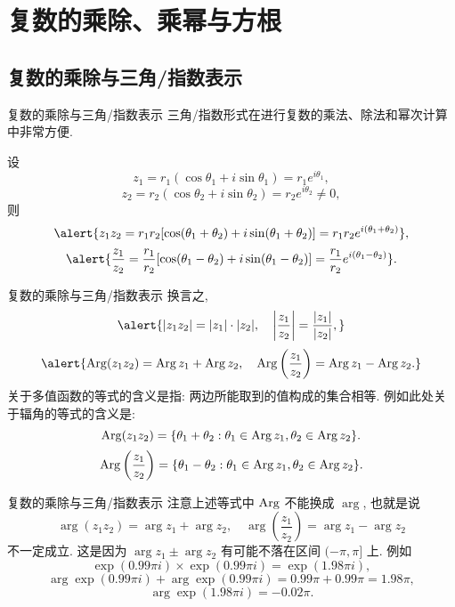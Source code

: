 \section{复数的乘除、乘幂与方根}

\subsection{复数的乘除与三角/指数表示}
\begin{frame}{复数的乘除与三角/指数表示}
	\onslide<+->
	三角/指数形式在进行复数的乘法、除法和幂次计算中非常方便.

	\onslide<+->
	\begin{theorem}
		设
		\[z_1=r_1(\cos\theta_1+i\sin\theta_1)=r_1e^{i\theta_1},\]
		\[z_2=r_2(\cos\theta_2+i\sin\theta_2)=r_2e^{i\theta_2}\neq 0,\]
		则
		\[\alert{z_1z_2=r_1r_2[\cos(\theta_1+\theta_2)+i\sin(\theta_1+\theta_2)]=r_1r_2e^{i(\theta_1+\theta_2)}},\]
		\[\alert{\frac{z_1}{z_2}=\frac{r_1}{r_2}[\cos(\theta_1-\theta_2)+i\sin(\theta_1-\theta_2)]=\frac{r_1}{r_2}e^{i(\theta_1-\theta_2)}}.\]
	\end{theorem}
\end{frame}


\begin{frame}{复数的乘除与三角/指数表示}
	\onslide<+->
	换言之,
	\[\alert{|z_1z_2|=|z_1|\cdot|z_2|,\quad\abs{\frac{z_1}{z_2}}=\frac{|z_1|}{|z_2|},}\]
	\onslide<+->
	\[\alert{\Arg(z_1z_2)=\Arg z_1+\Arg z_2,\quad
	\Arg\left(\frac{z_1}{z_2}\right)=\Arg z_1-\Arg z_2.}\]
	\onslide<+->
	关于多值函数的等式的含义是指: 两边所能取到的值构成的集合相等.
	\onslide<+->
	例如此处关于辐角的等式的含义是:
	\[\operatorname{Arg}(z_1z_2)={\left\{\theta_1+\theta_2:\theta_1\in\operatorname{Arg} z_1,\theta_2\in\operatorname{Arg} z_2\right\}}.\]
	\[\operatorname{Arg}\left(\frac{z_1}{z_2}\right)={\left\{\theta_1-\theta_2:\theta_1\in\operatorname{Arg} z_1,\theta_2\in\operatorname{Arg} z_2\right\}}.\]
\end{frame}


\begin{frame}{复数的乘除与三角/指数表示}
	\onslide<+->
	注意上述等式中 $\operatorname{Arg}$ 不能换成 $\arg$, 也就是说
	\[\arg(z_1z_2)=\arg z_1+\arg z_2,\quad
	\arg\left(\frac{z_1}{z_2}\right)=\arg z_1-\arg z_2\]
	\alert{不一定成立}.
	\onslide<+->
	这是因为 $\arg z_1\pm\arg z_2$ 有可能不落在区间 $(-\pi,\pi]$ 上.
	\onslide<+->
	例如
	\[\exp(0.99\pi i)\times \exp(0.99\pi i)=\exp(1.98\pi i),\]
	\vspace{-0.5\baselineskip}
	\onslide<+->
	\[\arg \exp(0.99\pi i)+\arg \exp(0.99\pi i)=0.99\pi+0.99\pi=1.98\pi,\]
	\vspace{-0.5\baselineskip}
	\onslide<+->
	\[\arg\exp(1.98\pi i)=-0.02\pi.\]
\end{frame}


